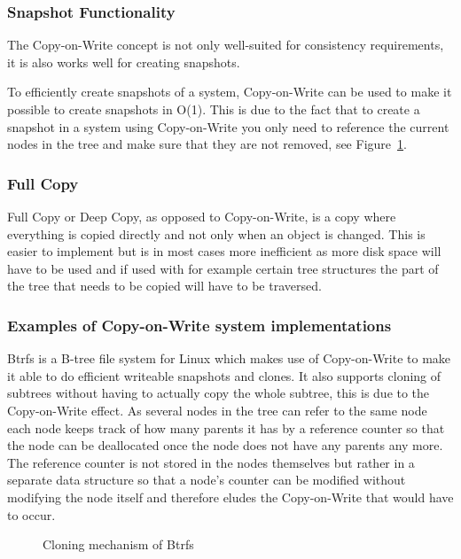 \documentclass[a4paper,12pt]{article}
\newcounter{subsubsubsection}[subsubsection]
\begin{document}
\subsubsection{Snapshot Functionality}
The Copy-on-Write concept is not only well-suited for consistency requirements, it is also works 
well for creating snapshots.

To efficiently create snapshots of a system, Copy-on-Write can be used to make it possible to create
snapshots in O(1)\cite{BTRFS}. This is due to the fact that to create a snapshot in a system using
Copy-on-Write you only need to reference the current nodes in the tree and make sure that they are
not removed, see Figure~\ref{fig:btrfs_tree}.

\subsubsection{Full Copy}
Full Copy or Deep Copy, as opposed to Copy-on-Write, is a copy where everything is copied directly
and not only when an object is changed. This is easier to implement but is in most cases more
inefficient as more disk space will have to be used and if used with for example certain tree 
structures the part of the tree that needs to be copied will have to be traversed. 

\subsubsection{Examples of Copy-on-Write system implementations}
Btrfs is a B-tree file system for Linux which makes use of Copy-on-Write to make it able to do
efficient writeable snapshots and clones. It also supports cloning of subtrees without having to
actually copy the whole subtree, this is due to the Copy-on-Write effect. As several nodes in the
tree can refer to the same node each node keeps track of how many parents it has by a reference
counter so that the node can be deallocated once the node does not have any parents any more. The
reference counter is not stored in the nodes themselves but rather in a separate data structure so
that a node's counter can be modified without modifying the node itself and therefore eludes the
Copy-on-Write that would have to occur.

\begin{figure}[H] 
    \caption{Cloning mechanism of Btrfs~\cite{BTRFS}}
    \label{fig:btrfs_tree}
\end{figure}
\end{document}

